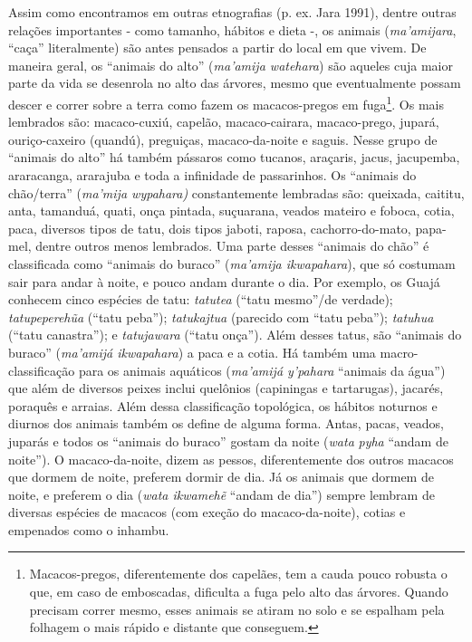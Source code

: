 Assim como encontramos em outras etnografias (p. ex. Jara 1991), dentre
outras relações importantes - como tamanho, hábitos e dieta -, os
animais (\emph{ma'amijara}, ``caça'' literalmente) são antes pensados a
partir do local em que vivem. De maneira geral, os ``animais do alto''
(\emph{ma'amija watehara}) são aqueles cuja maior parte da vida se
desenrola no alto das árvores, mesmo que eventualmente possam descer e
correr sobre a terra como fazem os macacos-pregos em fuga\footnote{Macacos-pregos,
  diferentemente dos capelães, tem a cauda pouco robusta o que, em caso
  de emboscadas, dificulta a fuga pelo alto das árvores. Quando precisam
  correr mesmo, esses animais se atiram no solo e se espalham pela
  folhagem o mais rápido e distante que conseguem.}. Os mais lembrados
são: macaco-cuxiú, capelão, macaco-cairara, macaco-prego, jupará,
ouriço-caxeiro (quandú), preguiças, macaco-da-noite e saguis. Nesse
grupo de ``animais do alto'' há também pássaros como tucanos, araçaris,
jacus, jacupemba, araracanga, ararajuba e toda a infinidade de
passarinhos. Os ``animais do chão/terra'' (\emph{ma'mija wypahara)}
constantemente lembradas são: queixada, caititu, anta, tamanduá, quati,
onça pintada, suçuarana, veados mateiro e foboca, cotia, paca, diversos
tipos de tatu, dois tipos jaboti, raposa, cachorro-do-mato, papa-mel,
dentre outros menos lembrados. Uma parte desses ``animais do chão'' é
classificada como ``animais do buraco'' (\emph{ma'amija ikwapahara}),
que só costumam sair para andar à noite, e pouco andam durante o dia.
Por exemplo, os Guajá conhecem cinco espécies de tatu: \emph{tatutea}
(``tatu mesmo''/de verdade); \emph{tatupeperehũa} (``tatu peba'');
\emph{tatukajtua} (parecido com ``tatu peba''); \emph{tatuhua} (``tatu
canastra''); e \emph{tatujawara} (``tatu onça''). Além desses tatus, são
``animais do buraco'' (\emph{ma'amijá ikwapahara}) a paca e a cotia. Há
também uma macro-classificação para os animais aquáticos (\emph{ma'amijá
y'pahara} ``animais da água'') que além de diversos peixes inclui
quelônios (capiningas e tartarugas), jacarés, poraquês e arraias. Além
dessa classificação topológica, os hábitos noturnos e diurnos dos
animais também os define de alguma forma. Antas, pacas, veados, juparás
e todos os ``animais do buraco'' gostam da noite (\emph{wata}
\emph{pyha} ``andam de noite''). O macaco-da-noite, dizem as pessos,
diferentemente dos outros macacos que dormem de noite, preferem dormir
de dia. Já os animais que dormem de noite, e preferem o dia (\emph{wata
ikwamehẽ} ``andam de dia'') sempre lembram de diversas espécies de
macacos (com exeção do macaco-da-noite), cotias e empenados como o
inhambu.

